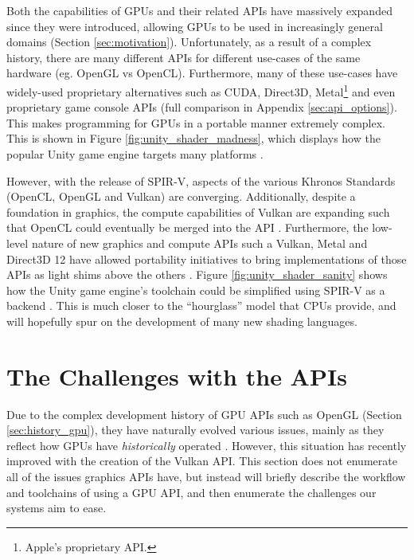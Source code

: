 \documentclass[a4paper,12pt,twoside,openright]{report}
\begin{document}
Both the capabilities of GPUs and their related APIs have massively expanded
since they were introduced, allowing GPUs to be used in increasingly general
domains (Section \ref{sec:motivation}). Unfortunately, as a result of a complex
history, there are many different APIs for different use-cases of the same
hardware (eg. OpenGL vs OpenCL). Furthermore, many of these use-cases have
widely-used proprietary alternatives such as CUDA, Direct3D,
Metal\footnote{Apple's proprietary API.} and even proprietary game console APIs
\cite{CUDA} \cite{Metal} \cite{Direct3D} \cite{PS4PortCrew} (full comparison in
Appendix \ref{sec:api_options}). This makes programming for GPUs in a portable
manner extremely complex. This is shown in Figure
\ref{fig:unity_shader_madness}, which displays how the popular Unity game
engine targets many platforms \cite{UnityShaderPipeline}.

However, with the release of SPIR-V, aspects of the various Khronos Standards
(OpenCL, OpenGL and Vulkan) are converging. Additionally, despite a foundation
in graphics, the compute capabilities of Vulkan are expanding such that OpenCL
could eventually be merged into the API \cite{VulkanOpenCLMerge}. Furthermore,
the low-level nature of new graphics and compute APIs such a Vulkan, Metal and
Direct3D 12 have allowed portability initiatives to bring implementations of
those APIs as light shims above the others \cite{VulkanPortabilityInitiative}
\cite{VulkanPortabilityInitiativeAnnouncement}. Figure
\ref{fig:unity_shader_sanity} shows how the Unity game engine's toolchain could
be simplified using SPIR-V as a backend \cite{UnityShaderPipeline}. This is
much closer to the ``hourglass'' model that CPUs provide, and will hopefully
spur on the development of many new shading languages.

\section{The Challenges with the APIs}

\label{sec:api_challanges}



Due to the complex development history of GPU APIs such as OpenGL (Section
\ref{sec:history_gpu}), they have naturally evolved various issues, mainly as
they reflect how GPUs have \textit{historically} operated \cite{TODO}. However,
this situation has recently improved with the creation of the Vulkan API. This
section does not enumerate all of the issues graphics APIs have, but instead
will briefly describe the workflow and toolchains of using a GPU API, and then
enumerate the challenges our systems aim to ease.
\end{document}
